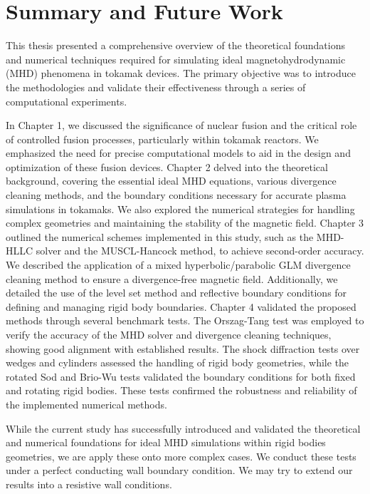 
\chapter{Summary and Future Work} %

\ifpdf
\graphicspath{{Chapter5/Figs/Raster/}{Chapter5/Figs/PDF/}{Chapter5/Figs/}}
\else
\graphicspath{{Chapter5/Figs/Vector/}{Chapter5/Figs/}}
\fi

\label{chapter 5}

This thesis presented a comprehensive overview of the theoretical foundations and numerical techniques required for simulating ideal magnetohydrodynamic (MHD) phenomena in tokamak devices. The primary objective was to introduce the methodologies and validate their effectiveness through a series of computational experiments.

In Chapter 1, we discussed the significance of nuclear fusion and the critical role of controlled fusion processes, particularly within tokamak reactors. We emphasized the need for precise computational models to aid in the design and optimization of these fusion devices. Chapter 2 delved into the theoretical background, covering the essential ideal MHD equations, various divergence cleaning methods, and the boundary conditions necessary for accurate plasma simulations in tokamaks. We also explored the numerical strategies for handling complex geometries and maintaining the stability of the magnetic field. Chapter 3 outlined the numerical schemes implemented in this study, such as the MHD-HLLC solver and the MUSCL-Hancock method, to achieve second-order accuracy. We described the application of a mixed hyperbolic/parabolic GLM divergence cleaning method to ensure a divergence-free magnetic field. Additionally, we detailed the use of the level set method and reflective boundary conditions for defining and managing rigid body boundaries. Chapter 4 validated the proposed methods through several benchmark tests. The Orszag-Tang test was employed to verify the accuracy of the MHD solver and divergence cleaning techniques, showing good alignment with established results. The shock diffraction tests over wedges and cylinders assessed the handling of rigid body geometries, while the rotated Sod and Brio-Wu tests validated the boundary conditions for both fixed and rotating rigid bodies. These tests confirmed the robustness and reliability of the implemented numerical methods.

While the current study has successfully introduced and validated the theoretical and numerical foundations for ideal MHD simulations within rigid bodies geometries, we are apply these onto more complex cases. We conduct these tests under a perfect conducting wall boundary condition. We may try to extend our results into a resistive wall conditions.